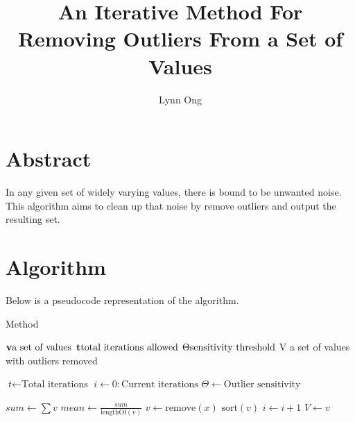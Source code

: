 \documentclass{book}
\begin{document}
\title{An Iterative Method For Removing Outliers From a Set of Values}
\author{Lynn Ong}
\maketitle

\section{Abstract}
In any given set of widely varying values, there is bound to be unwanted noise.
This algorithm aims to clean up that noise by remove outliers and output the resulting set.

\section{Algorithm}
Below is a pseudocode representation of the algorithm.


\begin{algorithm}
\caption{Method}

\begin{algorithmic}[1]

\Input
\State $\textbf{v} \space\space \text{a set of values}$
\State $\textbf{t} \space\space \text{total iterations allowed}$
\State $\Theta \space\space \text{sensitivity threshold}$
\EndInput
\Output
\State V a set of values with outliers removed
\EndOutput


\State $\textit{t} \gets \text{Total iterations}$
\State $\textit{i} \gets 0 : \text{Current iterations}$
\State $\Theta \gets \text{Outlier sensitivity}$

\State $\textit{sum} \gets \sum v$
\State $\textit{mean} \gets \frac{sum}{\text{lengthOf}(v)}$
\State $\textit{v} \gets \text{remove}(x)$
\EndIf
\EndFor
\State $\text{sort}(v)$
\State $\textit{i} \gets \textit{i} + 1$
\EndWhile
\State $V \gets v$


\EndProcedure

\end{algorithmic}

\end{algorithm}
\end{document}
